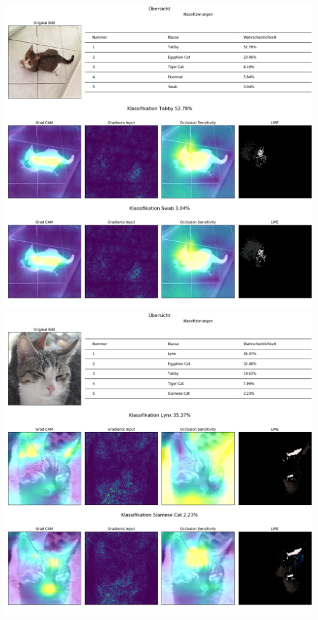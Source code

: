 \documentclass[
  12pt, %
  a4paper, %
  oneside, %
  openany, 
  numbers=noenddot, %
  BCOR=5mm, %
  parskip=half*, %
  thesis, %
]{bfhbook}
\begin{document}
\includegraphics[width=\textwidth]{Bilder/Mira-Classification-2.png}
\includegraphics[width=\textwidth]{Bilder/Merlin-Classification.png}
\end{document}

